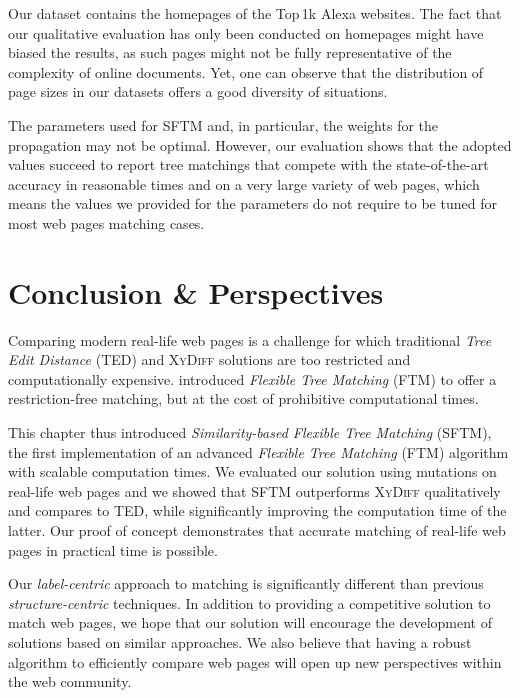 Our dataset contains the homepages of the Top\,1k Alexa websites.
The fact that our qualitative evaluation has only been conducted on homepages might have biased the results, as such pages might not be fully representative of the complexity of online documents.
Yet, one can observe that the distribution of page sizes in our datasets offers a good diversity of situations.

The parameters used for SFTM and, in particular, the weights for the propagation may not be optimal.
However, our evaluation shows that the adopted values succeed to report tree matchings that compete with the state-of-the-art accuracy in reasonable times and on a very large variety of web pages, which means the values we provided for the parameters do not require to be tuned for most web pages matching cases.


\section{Conclusion \& Perspectives}\label{sftm:sec:conclusion}
Comparing modern real-life web pages is a challenge for which traditional \emph{Tree Edit Distance} (TED) and \textsc{XyDiff} solutions are too restricted and computationally expensive. 
\cite{Kumar2011_FTM} introduced \emph{Flexible Tree Matching} (FTM) to offer a restriction-free matching, but at the cost of prohibitive computational times.

This chapter thus introduced \emph{Similarity-based Flexible Tree Matching} (SFTM), the first implementation of an advanced \emph{Flexible Tree Matching} (FTM) algorithm with scalable computation times.
We evaluated our solution using mutations on real-life web pages and we showed that SFTM outperforms \textsc{XyDiff} qualitatively and compares to TED, while significantly improving the computation time of the latter.
Our proof of concept demonstrates that accurate matching of real-life web pages in practical time is possible.

Our \textit{label-centric} approach to matching is significantly different than previous \textit{structure-centric} techniques.
In addition to providing a competitive solution to match web pages, we hope that our solution will encourage the development of solutions based on similar approaches.
We also believe that having a robust algorithm to efficiently compare web pages will open up new perspectives within the web community.

